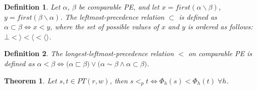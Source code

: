 \documentclass[AMA,STIX1COL]{WileyNJD-v2}
\newcommand{\Xl}{\langle}
\newcommand{\Xr}{\rangle}
\newcommand{\Xm}{\langle\!\rangle}
\newtheorem{Xdef}{Definition}
\newtheorem{XThe}{Theorem}
\begin{document}
    \begin{Xdef}\label{prec2}
    Let $\alpha$, $\beta$ be comparable PE, and let
    $x = first (\alpha \backslash \beta)$,
    $y = first (\beta \backslash \alpha)$.
    The \emph{leftmost-precedence} relation $\subset$ is defined as
    $\alpha \subset \beta \Leftrightarrow x < y$, where
    the set of possible values of $x$ and $y$ is ordered as follows:
    $\bot < \Xr < \Xl < \Xm$.
%
    \end{Xdef}

    \begin{Xdef}\label{pe_order}
    The \emph{longest-leftmost-precedence} relation $<$ on comparable PE is defined as
    $\alpha < \beta \Leftrightarrow
        \big( \alpha \sqsubset \beta \big) \vee
        \big( \alpha \sim \beta \wedge \alpha \subset \beta \big)$.
    \end{Xdef}

    \begin{XThe}\label{theorem_order_on_pe_same_as_on_pt}
    Let $s, t \in PT(r, w)$, then
    $s <_p t \Leftrightarrow \Phi_{h}(s) < \Phi_{h}(t) \; \forall h$.
    \end{XThe}
\end{document}
